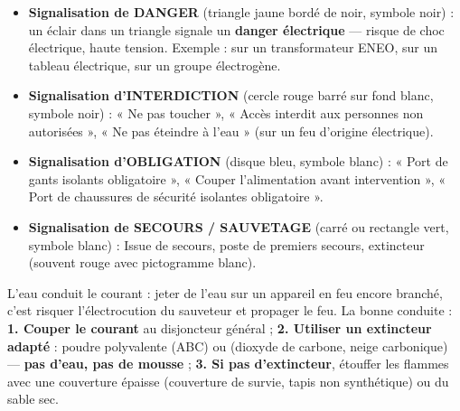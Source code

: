 \documentclass[11pt]{article}
\begin{document}
\begin{itemize}
\item \textbf{Signalisation de DANGER} (triangle jaune bordé de noir, symbole noir) : un éclair dans un triangle signale un \textbf{danger électrique} — risque de choc électrique, haute tension. Exemple : sur un transformateur ENEO, sur un tableau électrique, sur un groupe électrogène.
\item \textbf{Signalisation d'INTERDICTION} (cercle rouge barré sur fond blanc, symbole noir) : « Ne pas toucher », « Accès interdit aux personnes non autorisées », « Ne pas éteindre à l'eau » (sur un feu d'origine électrique).
\item \textbf{Signalisation d'OBLIGATION} (disque bleu, symbole blanc) : « Port de gants isolants obligatoire », « Couper l'alimentation avant intervention », « Port de chaussures de sécurité isolantes obligatoire ».
\item \textbf{Signalisation de SECOURS / SAUVETAGE} (carré ou rectangle vert, symbole blanc) : Issue de secours, poste de premiers secours, extincteur (souvent rouge avec pictogramme blanc).
\end{itemize}

\begin{attention}
L'eau conduit le courant : jeter de l'eau sur un appareil en feu encore branché, c'est risquer l'électrocution du sauveteur et propager le feu. La bonne conduite : \textbf{1. Couper le courant} au disjoncteur général ; \textbf{2. Utiliser un extincteur adapté} : poudre polyvalente (ABC) ou  (dioxyde de carbone, neige carbonique) — \textbf{pas d'eau, pas de mousse} ; \textbf{3. Si pas d'extincteur}, étouffer les flammes avec une couverture épaisse (couverture de survie, tapis non synthétique) ou du sable sec.
\end{attention}
\end{document}
